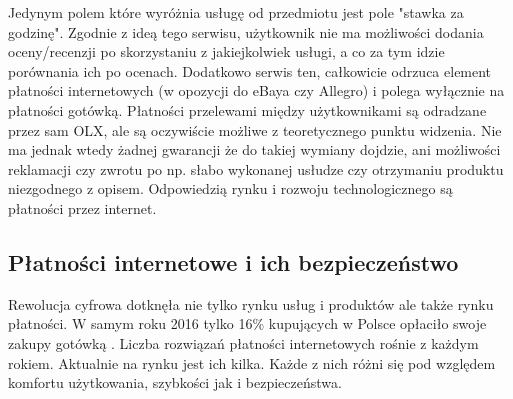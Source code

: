 \documentclass[12pt]{article}
\numberwithin{figure}{section}
\begin{document}
\begin{sloppypar}
Jedynym polem które wyróżnia usługę od przedmiotu jest pole "stawka za godzinę". Zgodnie z ideą tego serwisu, użytkownik nie ma możliwości dodania oceny/recenzji po skorzystaniu z jakiejkolwiek usługi, a co za tym idzie porównania ich po ocenach. Dodatkowo serwis ten, całkowicie odrzuca element płatności internetowych (w opozycji do eBaya czy Allegro) i polega wyłącznie na płatności gotówką. Płatności przelewami między użytkownikami są odradzane przez sam OLX, ale są oczywiście możliwe z teoretycznego punktu widzenia. Nie ma jednak wtedy żadnej gwarancji że do takiej wymiany dojdzie, ani możliwości reklamacji czy zwrotu po np. słabo wykonanej usłudze czy otrzymaniu produktu niezgodnego z opisem. Odpowiedzią rynku i rozwoju technologicznego są płatności przez internet.

\subsection{Płatności internetowe i ich bezpieczeństwo} \label{sec:payments}
Rewolucja cyfrowa dotknęła nie tylko rynku usług i produktów ale także rynku płatności. W samym roku 2016 tylko 16\% kupujących w Polsce opłaciło swoje zakupy gotówką \cite{gotowka}. Liczba rozwiązań płatności internetowych rośnie z każdym rokiem. Aktualnie na rynku jest ich kilka. Każde z nich różni się pod względem komfortu użytkowania, szybkości jak i bezpieczeństwa. 


\end{sloppypar}
\end{document}
